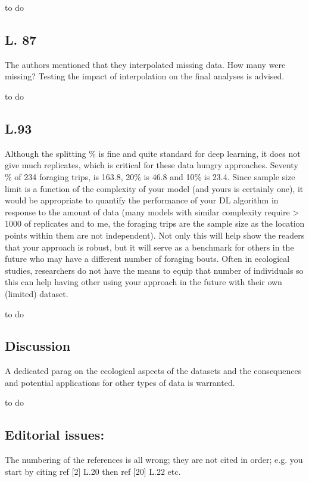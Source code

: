 \documentclass{ar2rc}
\begin{document}
\AR to do

\subsection*{L. 87}

\RC The authors mentioned that they interpolated missing data. How many were missing? Testing the impact of interpolation on the final analyses is advised.

\AR to do

\subsection*{L.93}

\RC Although the splitting \% is fine and quite standard for deep learning, it does not give much replicates, which is critical for these data hungry approaches. Seventy \% of 234 foraging trips, is 163.8, 20\% is 46.8 and 10\% is 23.4. Since sample size limit is a function of the complexity of your model (and yours is certainly one), it would be appropriate to quantify the performance of your DL algorithm in response to the amount of data (many models with similar complexity require > 1000 of replicates and to me, the foraging trips are the sample size as the location points within them are not independent). Not only this will help show the readers that your approach is robust, but it will serve as a benchmark for others in the future who may have a different number of foraging bouts. Often in ecological studies, researchers do not have the means to equip that number of individuals so this can help having other using your approach in the future with their own (limited) dataset.

\AR to do

\subsection*{Discussion}

\RC A dedicated parag on the ecological aspects of the datasets and the consequences and potential applications for other types of data is warranted.

\AR to do

\subsection*{Editorial issues:}

\RC The numbering of the references is all wrong; they are not cited in order; e.g. you start by citing ref [2] L.20 then ref [20] L.22 etc.
\end{document}
